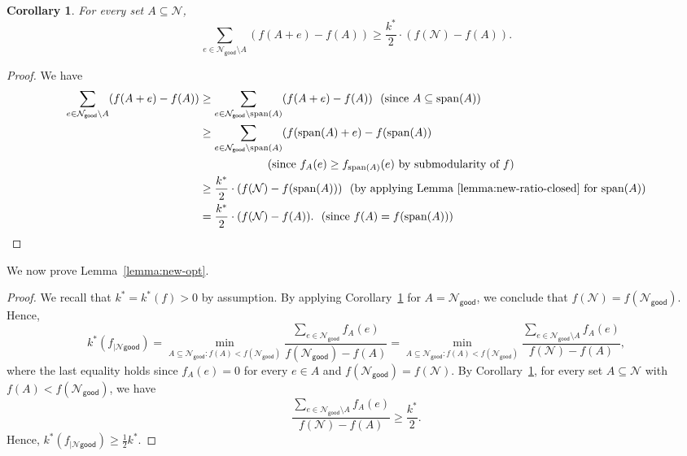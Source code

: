 \documentclass[11pt]{article}
\newtheorem{corollary}{Corollary}
\theoremstyle{definition}
\newcommand{\calN}{{\mathcal{N}}}
\newcommand{\good}{\mathsf{good}}
\begin{document}
\begin{corollary}\label{corollary:new-ratio}
    For every set $A\subseteq \mathcal{N}$,
    $$\sum_{e\in \mathcal{N}_{\good}\setminus A} \left(f(A+e)-f(A)\right) \geq \frac{k^*}{2}\cdot \left(f(\mathcal{N})-f(A)\right).$$
\end{corollary}
\begin{proof}
    We have
    $$\begin{aligned}
        \sum_{e\in \mathcal{N}_{\good}\setminus A} (f(A+e)-f(A)) &\geq \sum_{e\in \mathcal{N}_{\good}\setminus \text{span}(A)} (f(A+e)-f(A)) \ \ \text{(since $A\subseteq \text{span}(A)$)}\\
        &\geq \sum_{e\in \mathcal{N}_{\good}\setminus \text{span}(A)} (f(\text{span}(A)+e)-f(\text{span}(A)) \\ 
        & \ \ \ \ \ \ \ \ \ \ \ \ \ \ \ \ \ \ \text{(since $f_A(e)\geq f_{\text{span}(A)}(e)$ by submodularity of $f$)} \\
        &\geq \frac{k^*}{2} \cdot (f(\mathcal{N})-f(\text{span}(A))) \ \ \text{(by applying Lemma~\ref{lemma:new-ratio-closed} for $\text{span}(A)$)}\\
        &= \frac{k^*}{2}\cdot (f(\mathcal{N})-f(A)). \ \ \text{(since $f(A)=f(\text{span}(A))$)}
    \end{aligned}$$
\end{proof}

\iffalse
Let $k^*_{\text{onl}}$ be the corresponding upper bound for the optimum with respect to good elements, i.e.,
\begin{equation}
    k^*_{\text{onl}}:=\min_{A\subseteq \mathcal{N}_{\good}: f(A)<f(\mathcal{N}_{\good})} \frac{\sum_{e\in \mathcal{N}_{\good}}f_A(e)}{f(\mathcal{N}_{\good})-f(A)}. \label{def:new-opt-k}
\end{equation}
The following corollary shows that $k^*_{\text{onl}}$ is at least half of $k^*$.

\begin{corollary}\label{corollary:new-opt}
    $k_{\text{onl}}^*\geq \frac{1}{2}k^*$.
\end{corollary}
\fi

We now prove Lemma~\ref{lemma:new-opt}.
\begin{proof}
We recall that $k^*=k^*(f)>0$ by assumption. 
    By applying Corollary~\ref{corollary:new-ratio} for $A=\mathcal{N}_{\good}$, we conclude that $f(\mathcal{N})=f(\mathcal{N}_{\good})$. Hence,
    $$k^*(f_{|\calN{\good}})
    =\min_{A\subseteq \mathcal{N}_{\good}: f(A)<f(\mathcal{N}_{\good})} \frac{\sum_{e\in \mathcal{N}_{\good}}f_A(e)}{f(\mathcal{N}_{\good})-f(A)}
    =\min_{A\subseteq \mathcal{N}_{\good}: f(A)<f(\mathcal{N}_{\good})} \frac{\sum_{e\in \mathcal{N}_{\good}\setminus A}f_A(e)}{f(\mathcal{N})-f(A)},$$
    where the last equality holds since $f_A(e)=0$ for every $e\in A$ and $f(\calN_{\good})=f(\calN)$. By Corollary~\ref{corollary:new-ratio}, for every set $A\subseteq \mathcal{N}$ with $f(A)<f(\calN_{\good})$, we have
    $$\frac{\sum_{e\in \mathcal{N}_{\good}\setminus A}f_A(e)}{f(\mathcal{N})-f(A)}\geq \frac{k^*}{2}.$$
    Hence, $k^*(f_{|\calN{\good}})\geq \frac{1}{2}k^*$.
\end{proof}
\end{document}
